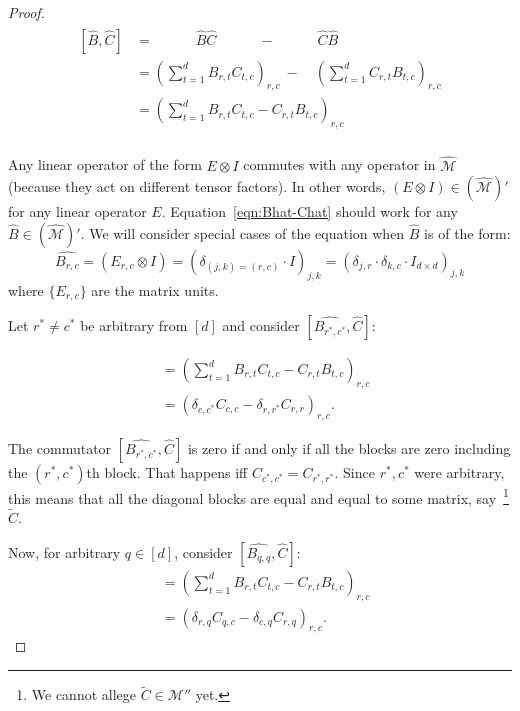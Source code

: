 \documentclass[12pt]{article}
\theoremstyle{plain}
\begin{document}
\begin{proof}
    \begin{align}
        \begin{split}
        \label{eqn:Bhat-Chat}
            [\widehat{B}, \widehat{C}] &= \quad\quad\quad\widehat{B} \widehat{C} \quad\quad\quad -  \quad\quad\quad\widehat{C} \widehat{B} \quad\quad\quad \\
        &= \left(\sum\limits_{t = 1}^d B_{r, t} C_{t,c}\right)_{r,c}  \ - \quad \left(\sum\limits_{t = 1}^d C_{r, t} B_{t,c} \right)_{r,c}\\
        &= \left(\sum\limits_{t = 1}^d B_{r, t} C_{t,c} - C_{r, t} B_{t,c}\right)_{r,c}\\
        \end{split}
    \end{align}

Any linear operator of the form $E \otimes I$ commutes with any operator in $\widehat{\mathcal{M}}$ (because they act on different tensor factors). In other words, $(E \otimes I) \in (\widehat{\mathcal{M}})'$ for any linear operator $E$. Equation~\ref{eqn:Bhat-Chat} should work for any $\widehat{B} \in (\widehat{\mathcal{M}})'$. We will consider special cases of the equation when $\widehat{B}$ is of the form:
\begin{equation}
    \widehat{B_{r,c}} = \left(E_{r,c} \otimes I\right) = \left(\delta_{(j,k) = (r,c)} \cdot I\right)_{j,k} = \left(\delta_{j,r} \cdot \delta_{k, c} \cdot I_{d\times d}\right)_{j,k}
\end{equation}
where $\{E_{r,c}\}$ are the matrix units.


Let $r^* \neq c^*$ be arbitrary from $[d]$ and consider $[\widehat{B_{r^*,c^*}}, \widehat{C}]$:

\begin{align*}
    [\widehat{B_{r^*,c^*}}, \widehat{C}] &= \left(\sum\limits_{t = 1}^d B_{r, t} C_{t,c} - C_{r, t} B_{t,c}\right)_{r,c}\\
    &= \left(\delta_{c,c^*}C_{c,c} - \delta_{r,r^*}C_{r,r}\right)_{r,c}.
\end{align*}

The commutator $[\widehat{B_{r^*,c^*}}, \widehat{C}]$ is zero if and only if all the blocks are zero including the $(r^*, c^*)$th block. That happens iff $C_{c^*, c^*} = C_{r^*, r^*}$. Since $r^*, c^*$ were arbitrary, this means that all the diagonal blocks are equal and equal to some matrix, say~\footnote{We cannot allege $\widetilde{C} \in \mathcal{M}''$ yet.} $\widetilde{C}$.

Now, for arbitrary $q \in [d]$, consider $[\widehat{B_{q,q}}, \widehat{C}]$:
\begin{align*}
    [\widehat{B_{q,q}}, \widehat{C}] &= \left(\sum\limits_{t = 1}^d B_{r, t} C_{t,c} - C_{r, t} B_{t,c}\right)_{r,c}\\
    &= \left(\delta_{r,q} C_{q,c} - \delta_{c,q} C_{r,q} \right)_{r,c}.
\end{align*}


\end{proof}
\end{document}
